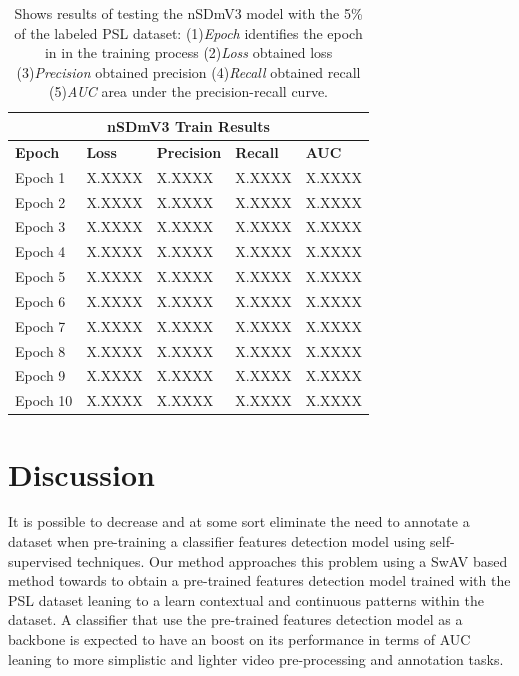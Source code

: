 \documentclass[twocolumn,conference]{article}
\begin{document}
\begin{table}
\captionsetup{font=footnotesize}
\centering
\begin{tabular}{ p{2.8cm} p{2.8cm} p{2.8cm} p{2.8cm} p{2.8cm} }
\toprule
\multicolumn{5}{c}{\textbf{nSDmV3 Train Results}} \\
\hline
\hline
\textbf{Epoch}&	\textbf{Loss}	&\textbf{Precision}	&\textbf{Recall}	&\textbf{AUC} \\
\hline
\midrule
Epoch 1&	X.XXXX&	X.XXXX&	X.XXXX&	X.XXXX\\
Epoch 2&	X.XXXX&	X.XXXX&	X.XXXX&	X.XXXX\\
Epoch 3&	X.XXXX&	X.XXXX&	X.XXXX&	X.XXXX\\
Epoch 4&	X.XXXX&	X.XXXX&	X.XXXX&	X.XXXX\\
Epoch 5&	X.XXXX&	X.XXXX&	X.XXXX&	X.XXXX\\
Epoch 6&	X.XXXX&	X.XXXX&	X.XXXX&	X.XXXX\\
Epoch 7&	X.XXXX&	X.XXXX&	X.XXXX&	X.XXXX\\
Epoch 8&	X.XXXX&	X.XXXX&	X.XXXX&	X.XXXX\\
Epoch 9&	X.XXXX&	X.XXXX&	X.XXXX&	X.XXXX\\
Epoch 10&	X.XXXX&	X.XXXX&	X.XXXX&	X.XXXX\\
\bottomrule
\end{tabular}
\caption{Shows results of testing the nSDmV3 model with the 5\% of the labeled PSL dataset: (1)\textit{Epoch} identifies the epoch in in the training process (2)\textit{Loss} obtained loss (3)\textit{Precision} obtained precision (4)\textit{Recall} obtained recall (5)\textit{AUC} area under the precision-recall curve.}
\label{tab:nSDmV3-detection-results-5-percent}
\end{table}

\section{Discussion}\label{discussion}
It is possible to decrease and at some sort eliminate the need to annotate a dataset when pre-training a classifier features detection model using self-supervised techniques.  Our method approaches this problem using a SwAV based method towards to obtain a pre-trained features detection model trained with the PSL dataset leaning to a learn contextual and continuous patterns within the dataset. A classifier that use the pre-trained features detection model as a backbone is expected to have an boost on its performance in terms of AUC leaning to more simplistic and lighter video pre-processing and annotation tasks.
\end{document}
